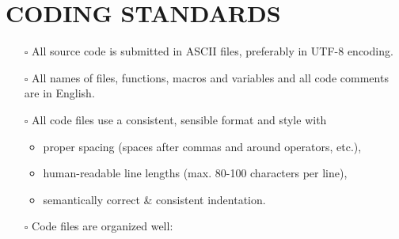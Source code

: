 \documentclass[
  paper=a4,
  ,captions=tableheading
]{scrartcl}
\providecommand{\tightlist}{%
  \setlength{\itemsep}{0pt}\setlength{\parskip}{0pt}}
\begin{document}
\section{CODING STANDARDS}\label{coding-standards}

\begin{itemize}
\item[$\square$]
  All source code is submitted in ASCII files, preferably in UTF-8 encoding.
\item[$\square$]
  All names of files, functions, macros and variables and all code comments are in English.
\item[$\square$]
  All code files use a consistent, sensible format and style with

  \begin{itemize}
  \tightlist
  \item
    proper spacing (spaces after commas and around operators, etc.),
  \item
    human-readable line lengths (max. 80-100 characters per line),
  \item
    semantically correct \& consistent indentation.
  \end{itemize}
\item[$\square$]
  Code files are organized well:


\end{itemize}
\end{document}
